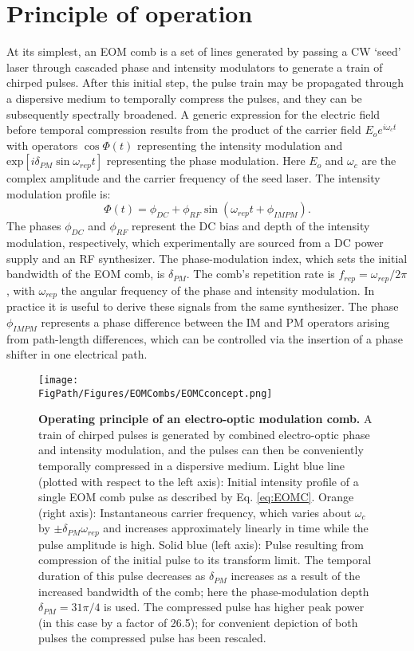 \section{Principle of operation}
At its simplest, an EOM comb is a set of lines generated by passing a CW `seed' laser through cascaded phase and intensity modulators to generate a train of chirped pulses. After this initial step, the pulse train may be propagated through a dispersive medium to temporally compress the pulses, and they can be subsequently spectrally broadened. A generic expression for the electric field before temporal compression results from the product of the carrier field $E_oe^{i\omega_ct}$ with operators $\cos\Phi(t)$ representing the intensity modulation and $\mathrm{exp}\left[i\delta_{PM} \sin{\omega_{rep} t}\right]$ representing the phase modulation. Here $E_o$ and $\omega_c$ are the complex amplitude and the carrier frequency of the seed laser. The intensity modulation profile is:
\begin{equation}
\Phi(t)=\phi_{DC}+\phi_{RF}\sin{(\omega_{rep}t+\phi_{IMPM})}.
\end{equation}
The phases $\phi_{DC}$ and $\phi_{RF}$ represent the DC bias and depth of the intensity modulation, respectively, which experimentally are sourced from a DC power supply and an RF synthesizer. The phase-modulation index, which sets the initial bandwidth of the EOM comb, is $\delta_{PM}$. The comb's repetition rate is $f_{rep}=\omega_{rep}/2\pi$, with $\omega_{rep}$ the angular frequency of the phase and intensity modulation. In practice it is useful to derive these signals from the same synthesizer. The phase $\phi_{IMPM}$ represents a phase difference between the IM and PM operators arising from path-length differences, which can be controlled via the insertion of a phase shifter in one electrical path. 

\begin{figure}[htpb]
	\begin{center}
		\texttt{[image: \\FigPath/Figures/EOMCombs/EOMCconcept.png]}
	\end{center}
	\caption[Operating principle of an electro-optic modulation comb]{\textbf{Operating principle of an electro-optic modulation comb.} A train of chirped pulses is generated by combined electro-optic phase and intensity modulation,  and the pulses can then be conveniently temporally compressed in a dispersive medium. Light blue line (plotted with respect to the left axis): Initial intensity profile of a single EOM comb pulse as described by Eq. \ref{eq:EOMC}. Orange (right axis): Instantaneous carrier frequency, which varies about $\omega_c$ by $\pm\delta_{PM}\omega_{rep}$ and increases approximately linearly in time while the pulse amplitude is high. Solid blue (left axis): Pulse resulting from compression of the initial pulse to its transform limit. The temporal duration of this pulse decreases as $\delta_{PM}$ increases as a result of the increased bandwidth of the comb; here the phase-modulation depth $\delta_{PM}=31\pi/4$ is used. The compressed pulse has higher peak power (in this case by a factor of 26.5); for convenient depiction of both pulses the compressed pulse has been rescaled.}
	\label{fig:EOMCconcept}
\end{figure} 

